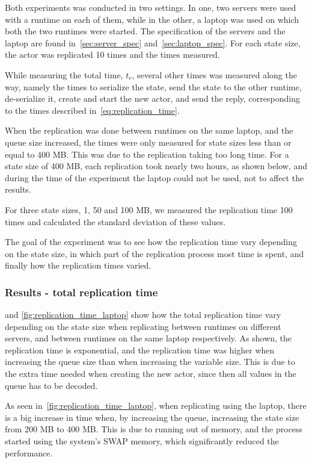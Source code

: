 \documentclass{cslthse-msc}
\begin{document}
Both experiments was conducted in two settings. In one, two servers were used with a runtime on each of them, while in the other, a laptop was used on which both the two runtimes were started. The specification of the servers and the laptop are found in~\cref{sec:server_spec} and~\cref{sec:laptop_spec}. For each state size, the actor was replicated 10 times and the times measured.

While measuring the total time, $t_r$, several other times was measured along the way, namely the times to serialize the state, send the state to the other runtime, de-serialize it, create and start the new actor, and send the reply, corresponding to the times described in~\cref{eq:replication_time}.

When the replication was done between runtimes on the same laptop, and the queue size increased, the times were only measured for state sizes less than or equal to 400 MB. This was due to the replication taking too long time. For a state size of 400 MB, each replication took nearly two hours, as shown below, and during the time of the experiment the laptop could not be used, not to affect the results.

For three state sizes, 1, 50 and 100 MB, we measured the replication time 100 times and calculated the standard deviation of these values.

The goal of the experiment was to see how the replication time vary depending on the state size, in which part of the replication process most time is spent, and finally how the replication times varied.

\subsubsection*{Results - total replication time}
 and \cref{fig:replication_time_laptop} show how the total replication time vary depending on the state size when replicating between runtimes on different servers, and between runtimes on the same laptop respectively. As shown, the replication time is exponential, and the replication time was higher when increasing the queue size than when increasing the variable size. This is due to the extra time needed when creating the new actor, since then all values in the queue has to be decoded. %

As seen in~\cref{fig:replication_time_laptop}, when replicating using the laptop, there is a big increase in time when, by increasing the queue, increasing the state size from 200 MB to 400 MB. This is due to running out of memory, and the process started using the system's SWAP memory, which significantly reduced the performance. 
\end{document}
